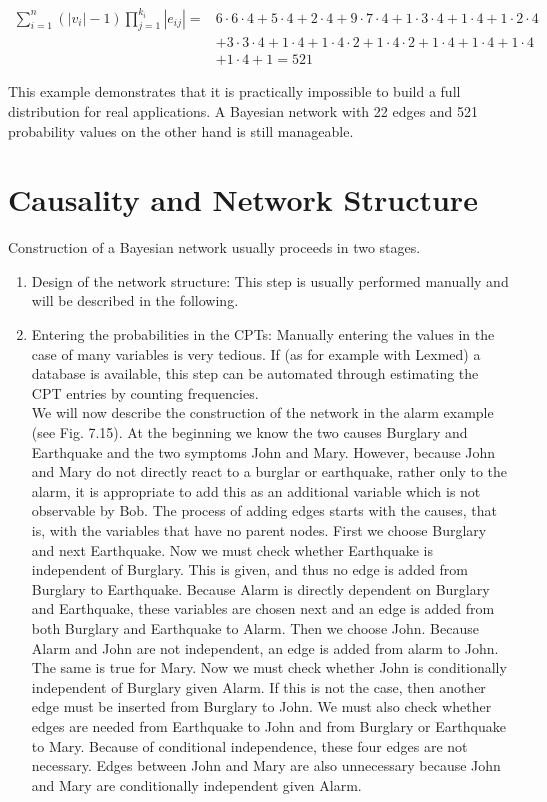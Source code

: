 \documentclass[10pt]{article}
\begin{document}
$$
\begin{aligned}
\sum_{i=1}^{n}\left(\left|v_{i}\right|-1\right) \prod_{j=1}^{k_{i}}\left|e_{i j}\right|= & 6 \cdot 6 \cdot 4+5 \cdot 4+2 \cdot 4+9 \cdot 7 \cdot 4+1 \cdot 3 \cdot 4+1 \cdot 4+1 \cdot 2 \cdot 4 \\
& +3 \cdot 3 \cdot 4+1 \cdot 4+1 \cdot 4 \cdot 2+1 \cdot 4 \cdot 2+1 \cdot 4+1 \cdot 4+1 \cdot 4 \\
& +1 \cdot 4+1=521
\end{aligned}
$$

This example demonstrates that it is practically impossible to build a full distribution for real applications. A Bayesian network with 22 edges and 521 probability values on the other hand is still manageable.

\section*{Causality and Network Structure}
Construction of a Bayesian network usually proceeds in two stages.

\begin{enumerate}
  \item Design of the network structure: This step is usually performed manually and will be described in the following.
  \item Entering the probabilities in the CPTs: Manually entering the values in the case of many variables is very tedious. If (as for example with Lexmed) a database is available, this step can be automated through estimating the CPT entries by counting frequencies.\\
We will now describe the construction of the network in the alarm example (see Fig. 7.15). At the beginning we know the two causes Burglary and Earthquake and the two symptoms John and Mary. However, because John and Mary do not directly react to a burglar or earthquake, rather only to the alarm, it is appropriate to add this as an additional variable which is not observable by Bob. The process of adding edges starts with the causes, that is, with the variables that have no parent nodes. First we choose Burglary and next Earthquake. Now we must check whether Earthquake is independent of Burglary. This is given, and thus no edge is added from Burglary to Earthquake. Because Alarm is directly dependent on Burglary and Earthquake, these variables are chosen next and an edge is added from both Burglary and Earthquake to Alarm. Then we choose John. Because Alarm and John are not independent, an edge is added from alarm to John. The same is true for Mary. Now we must check whether John is conditionally independent of Burglary given Alarm. If this is not the case, then another edge must be inserted from Burglary to John. We must also check whether edges are needed from Earthquake to John and from Burglary or Earthquake to Mary. Because of conditional independence, these four edges are not necessary. Edges between John and Mary are also unnecessary because John and Mary are conditionally independent given Alarm.
\end{enumerate}
\end{document}

